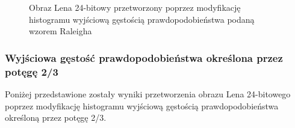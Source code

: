 \documentclass{classrep}
\begin{document}
\begin{figure}[H]%
    \centering
    \qquad
    \qquad
    \qquad
    \caption{Obraz Lena 24-bitowy przetworzony poprzez modyfikację histogramu wyjściową gęstością prawdopodobieństwa podaną wzorem Raleigha}%
\end{figure}

\subsubsection{Wyjściowa gęstość prawdopodobieństwa określona przez potęgę 2/3}
Poniżej przedstawione zostały wyniki przetworzenia obrazu Lena 24-bitowego poprzez modyfikację histogramu wyjściową gęstością prawdopodobieństwa określoną przez potęgę 2/3.
\end{document}
